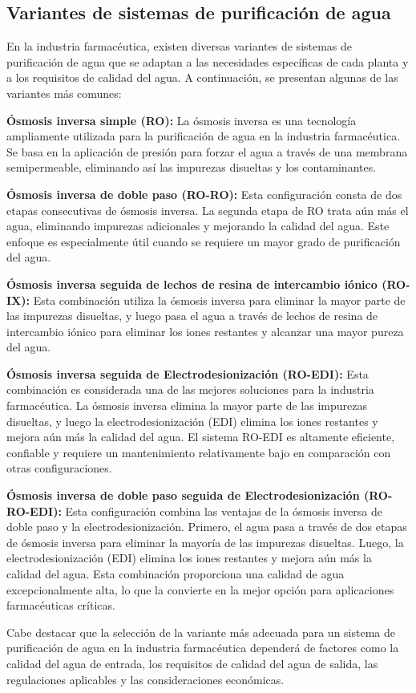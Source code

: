 \subsection{Variantes de sistemas de purificación de agua}

En la industria farmacéutica, existen diversas variantes de sistemas de purificación de agua que se adaptan a las necesidades específicas de cada planta y a los requisitos de calidad del agua. A continuación, se presentan algunas de las variantes más comunes:

\textbf{Ósmosis inversa simple (RO):} La ósmosis inversa es una tecnología ampliamente utilizada para la purificación de agua en la industria farmacéutica. Se basa en la aplicación de presión para forzar el agua a través de una membrana semipermeable, eliminando así las impurezas disueltas y los contaminantes.

\textbf{Ósmosis inversa de doble paso (RO-RO):} Esta configuración consta de dos etapas consecutivas de ósmosis inversa. La segunda etapa de RO trata aún más el agua, eliminando impurezas adicionales y mejorando la calidad del agua. Este enfoque es especialmente útil cuando se requiere un mayor grado de purificación del agua.

\textbf{Ósmosis inversa seguida de lechos de resina de intercambio iónico (RO-IX):} Esta combinación utiliza la ósmosis inversa para eliminar la mayor parte de las impurezas disueltas, y luego pasa el agua a través de lechos de resina de intercambio iónico para eliminar los iones restantes y alcanzar una mayor pureza del agua.

\textbf{Ósmosis inversa seguida de Electrodesionización (RO-EDI):} Esta combinación es considerada una de las mejores soluciones para la industria farmacéutica. La ósmosis inversa elimina la mayor parte de las impurezas disueltas, y luego la electrodesionización (EDI) elimina los iones restantes y mejora aún más la calidad del agua. El sistema RO-EDI es altamente eficiente, confiable y requiere un mantenimiento relativamente bajo en comparación con otras configuraciones.

\textbf{Ósmosis inversa de doble paso seguida de Electrodesionización (RO-RO-EDI):} Esta configuración combina las ventajas de la ósmosis inversa de doble paso y la electrodesionización. Primero, el agua pasa a través de dos etapas de ósmosis inversa para eliminar la mayoría de las impurezas disueltas. Luego, la electrodesionización (EDI) elimina los iones restantes y mejora aún más la calidad del agua. Esta combinación proporciona una calidad de agua excepcionalmente alta, lo que la convierte en la mejor opción para aplicaciones farmacéuticas críticas.


Cabe destacar que la selección de la variante más adecuada para un sistema de purificación de agua en la industria farmacéutica dependerá de factores como la calidad del agua de entrada, los requisitos de calidad del agua de salida, las regulaciones aplicables y las consideraciones económicas.
